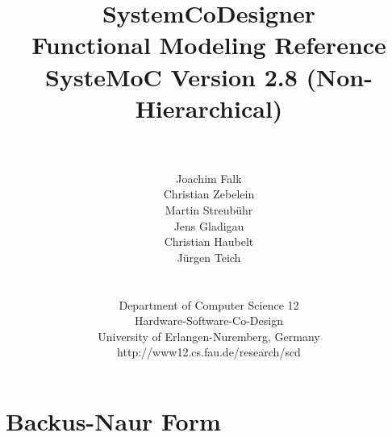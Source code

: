 \documentclass[a4paper, 12pt, BCOR2cm, headsepline, bibtotoc, idxtotoc]{scrbook}
\title{{\Huge SystemCoDesigner\\Functional Modeling Reference}\\ {\Large SysteMoC Version 2.8 (Non-Hierarchical)}}
\author{\\[5cm]\parbox{6cm}{\centering\large\sf Joachim Falk\\ Christian Zebelein\\ Martin Streub{\"u}hr\\ Jens Gladigau\\ Christian Haubelt\\ J{\"u}rgen Teich}\\[4cm]
          \parbox{10cm}{\centering\normalsize\sf
          Department of Computer Science 12\\
          Hardware-Software-Co-Design\\
          University of Erlangen-Nuremberg, Germany\\
          http://www12.cs.fau.de/research/scd}}
\date{}
\begin{document}
\maketitle

\tableofcontents







\appendix

\chapter{Backus-Naur Form}





\cleardoublepage
\end{document}
